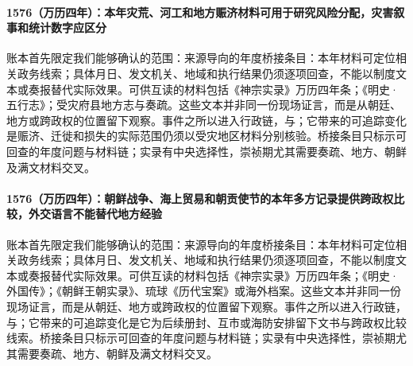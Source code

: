 \paragraph{1576（万历四年）：本年灾荒、河工和地方赈济材料可用于研究风险分配，灾害叙事和统计数字应区分} 账本首先限定我们能够确认的范围：来源导向的年度桥接条目：本年材料可定位相关政务线索；具体月日、发文机关、地域和执行结果仍须逐项回查，不能以制度文本或奏报替代实际效果。可供互读的材料包括《神宗实录》万历四年条；《明史·五行志》；受灾府县地方志与奏疏。这些文本并非同一份现场证言，而是从朝廷、地方或跨政权的位置留下观察。事件之所以进入行政链，与；它带来的可追踪变化是赈济、迁徙和损失的实际范围仍须以受灾地区材料分别核验。桥接条目只标示可回查的年度问题与材料链；实录有中央选择性，崇祯期尤其需要奏疏、地方、朝鲜及满文材料交叉。

\paragraph{1576（万历四年）：朝鲜战争、海上贸易和朝贡使节的本年多方记录提供跨政权比较，外交语言不能替代地方经验} 账本首先限定我们能够确认的范围：来源导向的年度桥接条目：本年材料可定位相关政务线索；具体月日、发文机关、地域和执行结果仍须逐项回查，不能以制度文本或奏报替代实际效果。可供互读的材料包括《神宗实录》万历四年条；《明史·外国传》；《朝鲜王朝实录》、琉球《历代宝案》或海外档案。这些文本并非同一份现场证言，而是从朝廷、地方或跨政权的位置留下观察。事件之所以进入行政链，与；它带来的可追踪变化是它为后续册封、互市或海防安排留下文书与跨政权比较线索。桥接条目只标示可回查的年度问题与材料链；实录有中央选择性，崇祯期尤其需要奏疏、地方、朝鲜及满文材料交叉。
